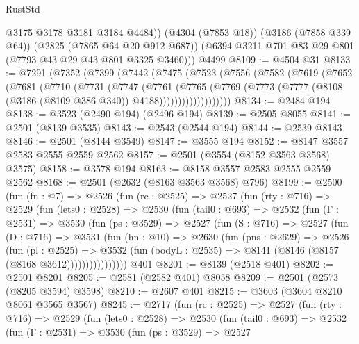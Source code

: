 \begin{lexlean}{RustStd}
\begin{coremodule}
          @3175
          @3178
          @3181
          @3184
          @4484))
      (@4304 (@7853 @18))
      (@3186 (@7858 @339 @64))
      (@2825 (@7865 @64 @20 @912 @687))
      (@6394 @3211 @701 @83 @29 @801 (@7793 @43 @29 @43 @801 @3325 @3460)))
    @4499
@8109 := @4504 @31
@8133 := @7291
    (@7352
      (@7399
        (@7442
          (@7475
            (@7523
              (@7556
                (@7582
                  (@7619
                    (@7652
                      (@7681
                        (@7710
                          (@7731
                            (@7747
                              (@7761
                                (@7765
                                  (@7769
                                    (@7773
                                      (@7777
                                        (@8108 (@3186 (@8109 @386 @340)) @4188)))))))))))))))))))
@8134 := @2484 @194
@8138 := @3523 (@2490 @194) (@2496 @194)
@8139 := @2505 @8055
@8141 := @2501 (@8139 @3535)
@8143 := @2543 (@2544 @194)
@8144 := @2539 @8143
@8146 := @2501 (@8144 @3549)
@8147 := @3555 @194
@8152 := @8147 @3557 @2583 @2555 @2559 @2562
@8157 := @2501 (@3554 (@8152 @3563 @3568) @3575)
@8158 := @3578 @194
@8163 := @8158 @3557 @2583 @2555 @2559 @2562
@8168 := @2501 (@2632 (@8163 @3563 @3568) @796)
@8199 := @2500
    (fun (fn : @7) =>
    @2526
      (fun (rc : @2525) =>
      @2527
        (fun (rty : @716) =>
        @2529
          (fun (lets0 : @2528) =>
          @2530
            (fun (tail0 : @693) =>
            @2532
              (fun (Γ : @2531) =>
              @3530
                (fun (ps : @3529) =>
                @2527
                  (fun (S : @716) =>
                  @2527
                    (fun (D : @716) =>
                    @3531
                      (fun (hn : @10) =>
                      @2630
                        (fun (pns : @2629) =>
                        @2526
                          (fun (pl : @2525) =>
                          @3532
                            (fun (bodyL : @2535) => @8141 (@8146 (@8157 (@8168 @3612))))))))))))))))
    @401
@8201 := @8139 (@2518 @401)
@8202 := @2501 @8201
@8205 := @2581 (@2582 @401) @8058
@8209 := @2501 (@2573 (@8205 @3594) @3598)
@8210 := @2607 @401
@8215 := @3603 (@3604 @8210 @8061 @3565 @3567)
@8245 := @2717
    (fun (rc : @2525) =>
    @2527
      (fun (rty : @716) =>
      @2529
        (fun (lets0 : @2528) =>
        @2530
          (fun (tail0 : @693) =>
          @2532
            (fun (Γ : @2531) =>
            @3530
              (fun (ps : @3529) =>
              @2527

\end{coremodule}
\end{lexlean}
